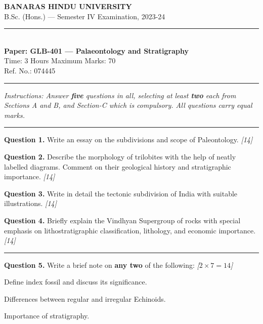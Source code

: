 \documentclass[11pt,a4paper]{article}
\newcommand{\pts}[1]{\hfill   \textit{[#1]}}
\begin{document}
\begin{center}
  {\large\bfseries BANARAS HINDU UNIVERSITY}\\[2pt]
  {\normalsize B.Sc. (Hons.) --- Semester IV Examination, 2023-24}\\[6pt]
  \rule{0.8\linewidth}{0.5pt}\\[6pt]
  {\large\bfseries Paper: GLB-401 --- Palaeontology and Stratigraphy}\\[4pt]
  {\normalsize Time: 3 Hours \hfill Maximum Marks: 70}\\[2pt]
  {\small Ref. No.: 074445}
\end{center}
\rule{\linewidth}{0.4pt}
\smallskip



\noindent   \textit{Instructions: Answer   \textbf{five} questions in all, selecting at least   \textbf{two} each from Sections A and B, and Section-C which is compulsory. All questions carry equal marks.}
\bigskip

\bigskip


\rule{\linewidth}{0.4pt}\smallskip




\noindent   \textbf{Question 1.} Write an essay on the subdivisions and scope of Paleontology. \pts{14}

\medskip


\noindent   \textbf{Question 2.} Describe the morphology of trilobites with the help of neatly labelled diagrams. Comment on their geological history and stratigraphic importance. \pts{14}

\medskip


\noindent   \textbf{Question 3.} Write in detail the tectonic subdivision of India with suitable illustrations. \pts{14}

\medskip


\noindent   \textbf{Question 4.} Briefly explain the Vindhyan Supergroup of rocks with special emphasis on lithostratigraphic classification, lithology, and economic importance. \pts{14}

\bigskip


\rule{\linewidth}{0.4pt}\smallskip




\noindent   \textbf{Question 5.} Write a brief note on   \textbf{any two} of the following: \pts{$2  \times 7 = 14$}

\begin{parts}
  \item Define index fossil and discuss its significance.
  \item Differences between regular and irregular Echinoids.
  \item Importance of stratigraphy.
\end{parts}
\end{document}
